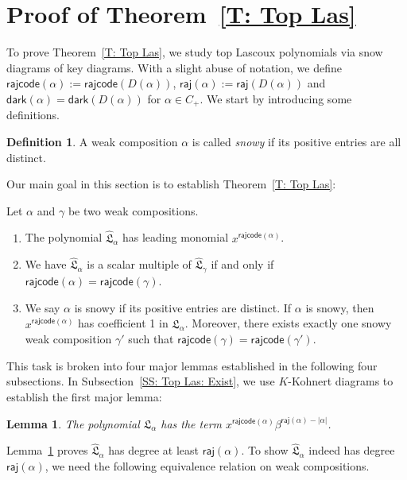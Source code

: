\documentclass[10pt]{amsart}
\theoremstyle{plain}
\theoremstyle{plain}
\theoremstyle{definition}
\theoremstyle{definition}
\newtheorem{defn}[defn]{Definition}
\theoremstyle{definition}
\theoremstyle{plain}
\theoremstyle{plain}
\theoremstyle{plain}
\newtheorem{lemma}[lemma]{Lemma}
\theoremstyle{plain}
\theoremstyle{plain}
\theoremstyle{remark}
\theoremstyle{remark}
\theoremstyle{plain}
\theoremstyle{plain}
\newenvironment{manualtheorem}[1]{
  \renewcommand\themanualtheoreminner{#1}
  \manualtheoreminner
}{\endmanualtheoreminner}
\newcommand{\fL}{\mathfrak{L}}
\newcommand{\fLb}{\fL}
\newcommand{\topLas}{\widehat{\fL}}
\newcommand{\dark}{\mathsf{dark}}
\newcommand{\rajcode}{\mathsf{rajcode}}
\newcommand{\raj}{\mathsf{raj}}
\newcommand{\definition}[1]{{\color{darkred}\emph{#1}}}
\begin{document}
\section{Proof of Theorem~\ref{T: Top Las}}
\label{S: weak composition}

To prove Theorem~\ref{T: Top Las},
we study top Lascoux polynomials via snow diagrams of key diagrams.
With a slight abuse of notation, we
define $\rajcode(\alpha) := \rajcode(D(\alpha))$, $\raj(\alpha) := \raj(D(\alpha))$
and $\dark(\alpha) = \dark(D(\alpha))$
for $\alpha \in C_+$.
We start by introducing some definitions.

\begin{defn}
A weak composition $\alpha$ is called \definition{snowy}
if its positive entries are all distinct. 
\end{defn}

Our main goal in this section is to establish 
Theorem~\ref{T: Top Las}:

\begin{manualtheorem}{\ref{T: Top Las}}
Let $\alpha$ and $\gamma$ be two weak compositions. 
\begin{enumerate}
\item[(a)]
The polynomial $\topLas_\alpha$ has leading monomial $x^{\rajcode(\alpha)}$.
\item[(b)] We have
$\topLas_\alpha$ is a scalar multiple of $\topLas_{\gamma}$
if and only if $\rajcode(\alpha) = \rajcode(\gamma)$.
\item[(c)] 
We say $\alpha$ is snowy if its
positive entries are distinct.
If $\alpha$ is snowy, then $x^{\rajcode(\alpha)}$ has coefficient 1 in $\topLas_\alpha$.
Moreover, 
there exists exactly one snowy weak composition $\gamma'$ 
such that $\rajcode(\gamma) = \rajcode(\gamma')$.
\end{enumerate}  
\end{manualtheorem}

This task is broken into four major lemmas
established in the following four subsections. 
In Subsection~\ref{SS: Top Las: Exist}, 
we use $K$-Kohnert diagrams to establish the first major lemma:

\begin{lemma}
\label{L: Top Las 1}
The polynomial $\fLb_\alpha$ has the term $x^{\rajcode(\alpha)} \beta^{\raj(\alpha) - |\alpha|}$.  
\end{lemma}

 


Lemma~\ref{L: Top Las 1} proves
$\topLas_\alpha$ has degree at least $\raj(\alpha)$.
To show $\topLas_\alpha$ indeed has degree $\raj(\alpha)$,
we need the following equivalence relation on weak compositions. 
\end{document}
